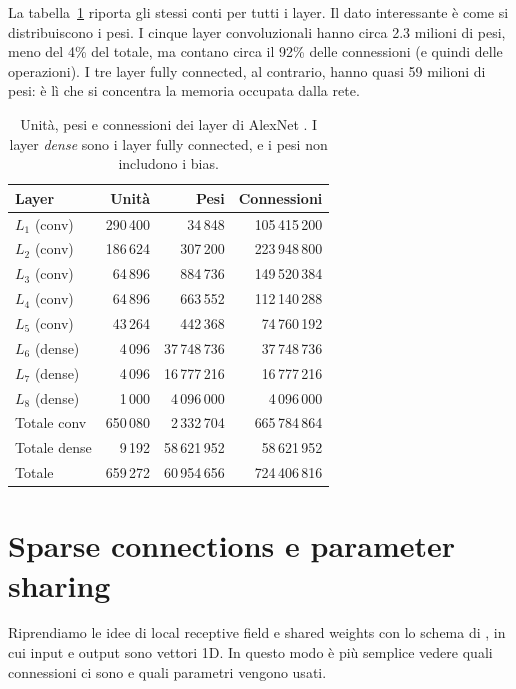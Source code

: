 La tabella~\ref{tab:alexnet} riporta gli stessi conti per tutti i layer. Il dato interessante è come si distribuiscono i pesi. I cinque layer convoluzionali hanno circa 2.3 milioni di pesi, meno del 4\% del totale, ma contano circa il 92\% delle connessioni (e quindi delle operazioni). I tre layer fully connected, al contrario, hanno quasi 59 milioni di pesi: è lì che si concentra la memoria occupata dalla rete.

\begin{table}[htbp]
\centering
\small
\begin{tabular}{@{}lrrr@{}}
\toprule
Layer & Unità & Pesi & Connessioni \\
\midrule
$L_1$ (conv) & 290\,400 & 34\,848 & 105\,415\,200 \\
$L_2$ (conv) & 186\,624 & 307\,200 & 223\,948\,800 \\
$L_3$ (conv) & 64\,896 & 884\,736 & 149\,520\,384 \\
$L_4$ (conv) & 64\,896 & 663\,552 & 112\,140\,288 \\
$L_5$ (conv) & 43\,264 & 442\,368 & 74\,760\,192 \\
$L_6$ (dense) & 4\,096 & 37\,748\,736 & 37\,748\,736 \\
$L_7$ (dense) & 4\,096 & 16\,777\,216 & 16\,777\,216 \\
$L_8$ (dense) & 1\,000 & 4\,096\,000 & 4\,096\,000 \\
\midrule
Totale conv & 650\,080 & 2\,332\,704 & 665\,784\,864 \\
Totale dense & 9\,192 & 58\,621\,952 & 58\,621\,952 \\
Totale & 659\,272 & 60\,954\,656 & 724\,406\,816 \\
\bottomrule
\end{tabular}
\caption{Unità, pesi e connessioni dei layer di AlexNet \cite{Krizhevsky2012}. I layer \emph{dense} sono i layer fully connected, e i pesi non includono i bias.}
\label{tab:alexnet}
\end{table}

\section{Sparse connections e parameter sharing}
Riprendiamo le idee di local receptive field e shared weights con lo schema di \cite{Goodfellow-et-al-2016}, in cui input e output sono vettori 1D. In questo modo è più semplice vedere quali connessioni ci sono e quali parametri vengono usati.

